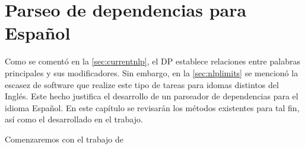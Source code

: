 \chapter{Parseo de dependencias para Español}\label{ch:depparsing}
Como se comentó en la \autoref{sec:currentnlp}, el \ac{DP} establece relaciones
entre palabras principales y sus modificadores. Sin embargo, en la
\autoref{sec:nlplimits} se mencionó la escasez de software que realize este tipo
de tareas para idomas distintos del Inglés. Este hecho justifica el desarrollo
de un parseador de dependencias para el idioma Español. En este capítulo se
revisarán los métodos existentes para tal fin, así como el desarrollado en el
trabajo.

Comenzaremos con el trabajo de \citeauthor{ballesteros2016} \cite{ballesteros2016}
